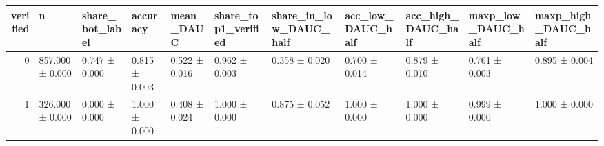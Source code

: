 \begin{tabular}{rllllllllll}
\toprule
verified & n & share_bot_label & accuracy & mean_DAUC & share_top1_verified & share_in_low_DAUC_half & acc_low_DAUC_half & acc_high_DAUC_half & maxp_low_DAUC_half & maxp_high_DAUC_half \\
\midrule
0 & 857.000 ± 0.000 & 0.747 ± 0.000 & 0.815 ± 0.003 & 0.522 ± 0.016 & 0.962 ± 0.003 & 0.358 ± 0.020 & 0.700 ± 0.014 & 0.879 ± 0.010 & 0.761 ± 0.003 & 0.895 ± 0.004 \\
1 & 326.000 ± 0.000 & 0.000 ± 0.000 & 1.000 ± 0.000 & 0.408 ± 0.024 & 1.000 ± 0.000 & 0.875 ± 0.052 & 1.000 ± 0.000 & 1.000 ± 0.000 & 0.999 ± 0.000 & 1.000 ± 0.000 \\
\bottomrule
\end{tabular}
